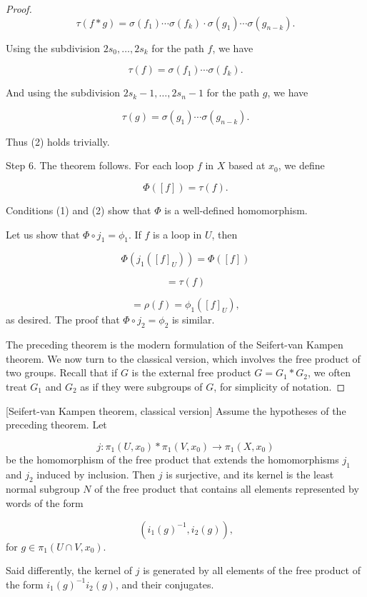 \begin{proof}
\[
\tau ( {f * g}) = \sigma ( f_{1}) \cdots \sigma ( f_{k}) \cdot \sigma ( g_{1}) \cdots \sigma ( g_{n - k}).
\]

Using the subdivision \(2s_{0},\ldots, 2s_{k}\) for the path \(f\), we have

\[
\tau ( f) = \sigma ( f_{1}) \cdots \sigma ( f_{k}).
\]

And using the subdivision \(2s_{k} - 1,\ldots, 2s_{n} - 1\) for the path \(g\), we have

\[
\tau ( g) = \sigma ( g_{1}) \cdots \sigma ( g_{n - k}).
\]

Thus (2) holds trivially.

Step 6. The theorem follows. For each loop \(f\) in \(X\) based at \(x_{0}\), we define

\[
\Phi ( [ f] ) = \tau ( f).
\]

Conditions (1) and (2) show that \(\Phi\) is a well-defined homomorphism.

Let us show that \(\Phi \circ {j}_{1} = {\phi }_{1}\). If \(f\) is a loop in \(U\), then

\[
\Phi ( {j_{1}( {[ f] }_{U}) }) = \Phi ( [ f] )
\]

\[
= \tau ( f)
\]

\[
= \rho ( f) = {\phi }_{1}( {[ f] }_{U}),
\]
as desired. The proof that \(\Phi \circ {j}_{2} = {\phi }_{2}\) is similar.

The preceding theorem is the modern formulation of the Seifert-van Kampen theorem. We now turn to the classical version, which involves the free product of two groups. Recall that if \(G\) is the external free product \(G = G_{1} * G_{2}\), we often treat \(G_{1}\) and \(G_{2}\) as if they were subgroups of \(G\), for simplicity of notation.
\end{proof}
\begin{theorem}
\label{thm:\thetheorem}[Seifert-van Kampen theorem, classical version]
Assume the hypotheses of the preceding theorem. Let

\[
j : {\pi }_{1}( {U,x_{0}}) * {\pi }_{1}( {V,x_{0}}) \rightarrow {\pi }_{1}( {X,x_{0}})
\]
be the homomorphism of the free product that extends the homomorphisms \(j_{1}\) and \(j_{2}\) induced by inclusion. Then \(j\) is surjective, and its kernel is the least normal subgroup \(N\) of the free product that contains all elements represented by words of the form

\[
( {i_{1}{( g) }^{-1},i_{2}( g) }) \text{,}
\]
for \(g \in {\pi }_{1}( {U \cap V,x_{0}})\).

Said differently, the kernel of \(j\) is generated by all elements of the free product of the form \(i_{1}{( g) }^{-1}i_{2}( g)\), and their conjugates.
\end{theorem}

